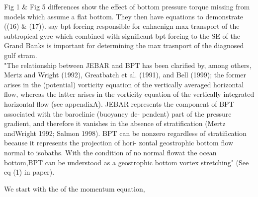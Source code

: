 \documentclass[..\EOYR.tex]{subfiles}
\begin{document}
\citep{Greatbatch1991} Fig 1 \& Fig 5 differences show the effect of bottom pressure torque missing from models which assume a flat bottom. They then have equations to demonstrate ((16) \& (17)). \citep{Greatbatch1991} say bpt forcing responsible for enhacnign max transport of the subtropical gyre which combined with significant bpt forcing to the SE of the Grand Banks is important for determining the max trasnport of the diagnosed gulf stram. \\
\citep{Yeager2015} "The relationship between JEBAR and BPT has been clarified by, among others, Mertz and Wright (1992), Greatbatch et al. (1991), and Bell (1999); the former arises in the (potential) vorticity equation of the vertically averaged horizontal flow, whereas the latter arises in the vorticity equation of the vertically integrated horizontal flow (see appendixA). JEBAR represents the component of BPT associated with the baroclinic (buoyancy de- pendent) part of the pressure gradient, and therefore it vanishes in the absence of stratification (Mertz andWright 1992; Salmon 1998). BPT can be nonzero regardless of stratification because it represents the projection of hori- zontal geostrophic bottom flow normal to isobaths. With the condition of no normal flowat the ocean bottom,BPT can be understood as a geostrophic bottom vortex stretching" (See eq (1) in paper).

We start with the  of the momentum equation,
\begin{equation}\label{momentum}
\end{equation}
\end{document}
